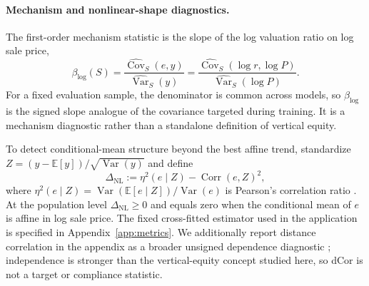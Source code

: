 \documentclass[10pt]{article}
\theoremstyle{definition}
\newcommand{\E}{\mathbb{E}}
\newcommand{\Var}{\operatorname{Var}}
\newcommand{\1}{\mathbf{1}}
\begin{document}
\paragraph{Mechanism and nonlinear-shape diagnostics.}
The first-order mechanism statistic is the slope of the log valuation ratio on log sale price,
\begin{equation}
\label{eq:log_ratio_slope}
\beta_{\log}(S)
=
\frac{\widehat{\operatorname{Cov}}_S(e,y)}{\widehat{\operatorname{Var}}_S(y)}
=
\frac{\widehat{\operatorname{Cov}}_S(\log r,\log P)}{\widehat{\operatorname{Var}}_S(\log P)}.
\end{equation}
For a fixed evaluation sample, the denominator is common across models, so $\beta_{\log}$ is the signed slope analogue of the covariance targeted during training. It is a mechanism diagnostic rather than a standalone definition of vertical equity.

To detect conditional-mean structure beyond the best affine trend, standardize $Z=(y-\E[y])/\sqrt{\Var(y)}$ and define
\begin{equation}
\label{eq:nonlinearity_gap}
\Delta_{\mathrm{NL}}
:=
\eta^2(e\mid Z)-\operatorname{Corr}(e,Z)^2,
\end{equation}
where $\eta^2(e\mid Z)=\Var(\E[e\mid Z])/\Var(e)$ is Pearson's correlation ratio \cite{DoksumSamarov1995}. At the population level $\Delta_{\mathrm{NL}}\ge0$ and equals zero when the conditional mean of $e$ is affine in log sale price. The fixed cross-fitted estimator used in the application is specified in Appendix~\ref{app:metrics}. We additionally report distance correlation in the appendix as a broader unsigned dependence diagnostic \cite{SzekelyRizzoBakirov2007}; independence is stronger than the vertical-equity concept studied here, so dCor is not a target or compliance statistic.
\end{document}
